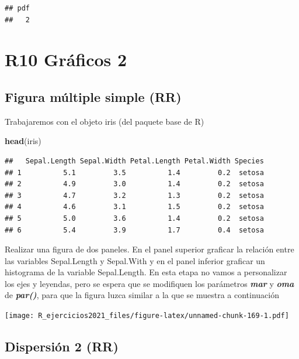 \documentclass[]{book}
\newenvironment{Shaded}{\begin{snugshade}}{\end{snugshade}}
\newcommand{\KeywordTok}[1]{\textcolor[rgb]{0.13,0.29,0.53}{\textbf{#1}}}
\newcommand{\NormalTok}[1]{#1}
\begin{document}
\begin{verbatim}
## pdf 
##   2
\end{verbatim}

\hypertarget{r10-gruxe1ficos-2}{%
\chapter*{R10 Gráficos 2}\label{r10-gruxe1ficos-2}}

\hypertarget{figura-muxfaltiple-simple-rr}{%
\section{Figura múltiple simple (RR)}\label{figura-muxfaltiple-simple-rr}}

Trabajaremos con el objeto iris (del paquete base de R)

\begin{Shaded}
\begin{Highlighting}[]
\KeywordTok{head}\NormalTok{(iris)}
\end{Highlighting}
\end{Shaded}

\begin{verbatim}
##   Sepal.Length Sepal.Width Petal.Length Petal.Width Species
## 1          5.1         3.5          1.4         0.2  setosa
## 2          4.9         3.0          1.4         0.2  setosa
## 3          4.7         3.2          1.3         0.2  setosa
## 4          4.6         3.1          1.5         0.2  setosa
## 5          5.0         3.6          1.4         0.2  setosa
## 6          5.4         3.9          1.7         0.4  setosa
\end{verbatim}

Realizar una figura de dos paneles. En el panel superior graficar la relación entre las variables Sepal.Length y Sepal.With y en el panel inferior graficar un histograma de la variable Sepal.Length. En esta etapa no vamos a personalizar los ejes y leyendas, pero se espera que se modifiquen los parámetros \emph{\textbf{mar}} y \emph{\textbf{oma}} de \emph{\textbf{par()}}, para que la figura luzca similar a la que se muestra a continuación

\texttt{[image: R\_ejercicios2021\_files/figure-latex/unnamed-chunk-169-1.pdf]}

\hypertarget{dispersiuxf3n-2-rr}{%
\section{Dispersión 2 (RR)}\label{dispersiuxf3n-2-rr}}
\end{document}
